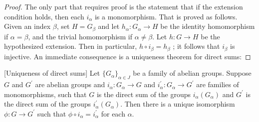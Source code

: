 \begin{proof}
The only part that requires proof is the statement that if the extension condition holds, then each \(i_{\alpha }\) is a monomorphism. That is proved as follows. Given an index \(\beta\), set \(H = G_{\beta }\) and let \(h_{\alpha } : G_{\alpha } \rightarrow H\) be the identity homomorphism if \(\alpha = \beta\), and the trivial homomorphism if \(\alpha \neq \beta\). Let \(h : G \rightarrow H\) be the hypothesized extension. Then in particular, \(h \circ {i}_{\beta } = h_{\beta }\) ; it follows that \(i_{\beta }\) is injective.
An immediate consequence is a uniqueness theorem for direct sums:
\end{proof}
\begin{theorem}
\label{thm:\thetheorem}[Uniqueness of direct sums]
Let \({\{ G_{\alpha }\} }_{\alpha \in J}\) be a family of abelian groups. Suppose \(G\) and \(G^{\prime }\) are abelian groups and \(i_{\alpha } : G_{\alpha } \rightarrow G\) and \(i_{\alpha }^{\prime } : G_{\alpha } \rightarrow {G}^{\prime }\) are families of monomorphisms, such that \(G\) is the direct sum of the groups \(i_{\alpha }( G_{\alpha })\) and \(G^{\prime }\) is the direct sum of the groups \(i_{\alpha }^{\prime }( G_{\alpha })\). Then there is a unique isomorphism \(\phi : G \rightarrow {G}^{\prime }\) such that \(\phi \circ {i}_{\alpha } = i_{\alpha }^{\prime }\) for each \(\alpha\).
\end{theorem}

